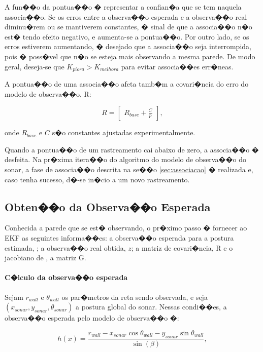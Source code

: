A fun��o da pontua��o � representar a confian�a que se tem naquela associa��o. Se os erros entre a observa��o esperada e a observa��o real diminu�rem ou se mantiverem constantes, � sinal de que a associa��o n�o est� tendo efeito negativo, e aumenta-se a pontua��o. Por outro lado, se os erros estiverem aumentando, � desejado que a associa��o seja interrompida, pois � poss�vel que n�o se esteja mais observando a mesma parede. De modo geral, deseja-se que $K_{piora} > K_{melhora}$ para evitar associa��es err�neas.

A pontua��o de uma associa��o afeta tamb�m a covari�ncia do erro do modelo de observa��o, R:

\begin{equation}
R = \begin{bmatrix}
	R_{base} + \frac{C}{p}
\end{bmatrix},
\label{eq:matrizr}
\end{equation}

onde $R_{base}$ e $C$ s�o constantes ajustadas experimentalmente.

Quando a pontua��o de um rastreamento cai abaixo de zero, a associa��o � desfeita. Na pr�xima itera��o do algoritmo do modelo de observa��o do sonar, a fase de associa��o descrita na se��o \ref{sec:associacao} � realizada e, caso tenha sucesso, d�-se in�cio a um novo rastreamento.

\subsection{Obten��o da Observa��o Esperada}
\label{sec:obsesperada}
Conhecida a parede que se est� observando, o pr�ximo passo � fornecer ao EKF as seguintes informa��es: a observa��o esperada para a postura estimada, \hx; a observa��o real obtida, $z$; a matriz de covari�ncia, R e o jacobiano de \hx, a matriz G.

\paragraph{C�lculo da observa��o esperada}

Sejam $r_{wall}$ e $\theta_{wall}$ os par�metros da reta sendo observada, e seja $(x_{sonar}, y_{sonar}, \theta_{sonar})$ a postura global do sonar. Nessas condi��es, a observa��o esperada pelo modelo de observa��o �:

\begin{equation*}
h(x) = \frac{r_{wall} - x_{sonar}\cos \theta_{wall} - y_{sonar}\sin \theta_{wall}}{\sin(\beta)},
\end{equation*}

